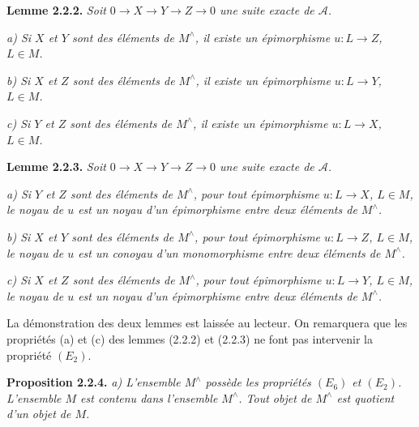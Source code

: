 \clearpage
{}%
\begingroup\small\setlength{\parskip}{0pt}\setlength{\emergencystretch}{1.5em}
\setlength{\abovedisplayskip}{4pt plus 2pt minus 2pt}%
\setlength{\belowdisplayskip}{4pt plus 2pt minus 2pt}%

\noindent\textbf{Lemme 2.2.2.}\quad
\textit{Soit
$0\longrightarrow X\longrightarrow Y\longrightarrow Z\longrightarrow0$
une suite exacte de $\mathcal A$.}

\noindent\textit{a) Si $X$ et $Y$ sont des éléments de $M^{\wedge}$, il
existe un épimorphisme $u\colon L\longrightarrow Z$, $L\in M$.}

\noindent\textit{b) Si $X$ et $Z$ sont des éléments de $M^{\wedge}$, il
existe un épimorphisme $u\colon L\longrightarrow Y$, $L\in M$.}

\noindent\textit{c) Si $Y$ et $Z$ sont des éléments de $M^{\wedge}$, il
existe un épimorphisme $u\colon L\longrightarrow X$, $L\in M$.}

\medskip\noindent\textbf{Lemme 2.2.3.}\quad
\textit{Soit
$0\longrightarrow X\longrightarrow Y\longrightarrow Z\longrightarrow0$
une suite exacte de $\mathcal A$.}

\noindent\textit{a) Si $Y$ et $Z$ sont des éléments de $M^{\wedge}$, pour
tout épimorphisme $u\colon L\longrightarrow X$, $L\in M$, le noyau de
$u$ est un noyau d'un épimorphisme entre deux éléments de $M^{\wedge}$.}

\noindent\textit{b) Si $X$ et $Y$ sont des éléments de $M^{\wedge}$, pour
tout épimorphisme $u\colon L\longrightarrow Z$, $L\in M$, le noyau de
$u$ est un conoyau d'un monomorphisme entre deux éléments de
$M^{\wedge}$.}

\noindent\textit{c) Si $X$ et $Z$ sont des éléments de $M^{\wedge}$, pour
tout épimorphisme $u\colon L\longrightarrow Y$, $L\in M$, le noyau de
$u$ est un noyau d'un épimorphisme entre deux éléments de $M^{\wedge}$.}

La démonstration des deux lemmes est laissée au lecteur. On remarquera que
les propriétés (a) et (c) des lemmes (2.2.2) et (2.2.3) ne font pas
intervenir la propriété $(E_2)$.

\medskip\noindent\textbf{Proposition 2.2.4.}\quad
\textit{a) L'ensemble $M^{\wedge}$ possède les propriétés $(E_6)$ et
$(E_2)$. L'ensemble $M$ est contenu dans l'ensemble $M^{\wedge}$. Tout
objet de $M^{\wedge}$ est quotient d'un objet de $M$.}

